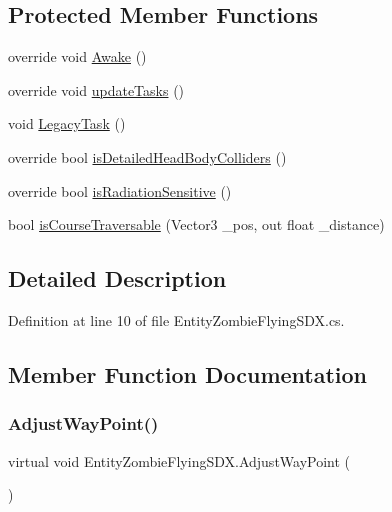 \subsection*{Protected Member Functions}
\begin{DoxyCompactItemize}
\item 
override void \mbox{\hyperlink{class_entity_zombie_flying_s_d_x_a2f839723f8fbccdb94b343d36f2cbf97}{Awake}} ()
\item 
override void \mbox{\hyperlink{class_entity_zombie_flying_s_d_x_a835c38b9472784c6867b99482a76342b}{update\+Tasks}} ()
\item 
void \mbox{\hyperlink{class_entity_zombie_flying_s_d_x_ad49759f36ac58d6488a113bb1af204ec}{Legacy\+Task}} ()
\item 
override bool \mbox{\hyperlink{class_entity_zombie_flying_s_d_x_a755aa6c3d4e6ca8cdbf9605e47fc7b0f}{is\+Detailed\+Head\+Body\+Colliders}} ()
\item 
override bool \mbox{\hyperlink{class_entity_zombie_flying_s_d_x_a1246287b43ac257f9b42fc6856c972b3}{is\+Radiation\+Sensitive}} ()
\item 
bool \mbox{\hyperlink{class_entity_zombie_flying_s_d_x_a7598546d2e99994eee1ae54bcc79b4fb}{is\+Course\+Traversable}} (Vector3 \+\_\+pos, out float \+\_\+distance)
\end{DoxyCompactItemize}


\subsection{Detailed Description}


Definition at line 10 of file Entity\+Zombie\+Flying\+S\+D\+X.\+cs.



\subsection{Member Function Documentation}
\mbox{\label{class_entity_zombie_flying_s_d_x_a51bebc522872f4939ff7e2a6ae43a0b6}} 
\subsubsection{\texorpdfstring{AdjustWayPoint()}{AdjustWayPoint()}}
{\footnotesize\ttfamily virtual void Entity\+Zombie\+Flying\+S\+D\+X.\+Adjust\+Way\+Point (\begin{DoxyParamCaption}{ }\end{DoxyParamCaption})\hspace{0.3cm}{\ttfamily [virtual]}}




